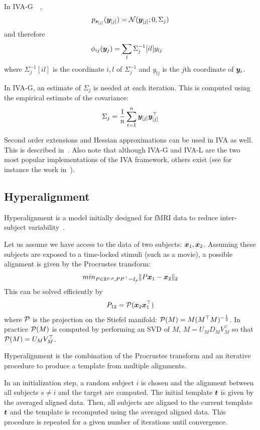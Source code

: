 In IVA-G~\cite{anderson2011joint}~\cite{via2011maximum},
\begin{align}
  p_{\boldsymbol{s}_{[j]}}(\boldsymbol{y}_{[j]}) = \mathcal{N}( \boldsymbol{y}_{[j]}; 0, \Sigma_j)
\end{align}
and therefore
\begin{align}
  \phi_{ij}(\boldsymbol{y}_j) &= \sum_l \Sigma_j^{-1}[il] y_{lj}
\end{align}
where  $\Sigma_j^{-1}[il]$ is the coordinate $i, l$ of $\Sigma_j^{-1}$ and
$y_{lj}$ is the $j$th coordinate of $\boldsymbol{y}_i$.

In IVA-G, an estimate of $\Sigma_j$ is needed at each iteration. This is
computed using the empirical estimate of the covariance:
\begin{align}
\Sigma_j = \frac1{n} \sum_{t=1}^n \boldsymbol{y}_{[j]} \boldsymbol{y}_{[j]}^{\top}
\end{align}

Second order extensions and Hessian approximations can be used in IVA as well.
This is described in~\cite{anderson2011joint}. Also note that although IVA-G and
IVA-L are the two most popular implementations of the IVA framework, others exist
(see for instance the work in~\cite{anderson2013independent}).

\subsection{Hyperalignment}
Hyperalignment is a model initially designed for fMRI data to reduce
inter-subject variability~\cite{haxby2011common}.

Let us assume we have access to the data of two subjects: $\boldsymbol{x}_1, \boldsymbol{x}_2$.
Assuming these subjects are exposed to a time-locked stimuli (such as a movie), a possible alignment is given by the Procrustes transform:
\begin{align}
min_{P \in \mathbb{R}^{p, p}, PP^{\top} = I_p} \|P \boldsymbol{x}_1 - \boldsymbol{x}_2 \|_2
\end{align}
This can be solved efficiently by
\begin{align}
  P_{12} = \mathcal{P}(\boldsymbol{x}_2 \boldsymbol{x}_1^{\top})
\end{align}
where $\mathcal{P}$ is the projection on the Stiefel manifold: $\mathcal{P}(M) = M
(M^{\top}M)^{-\frac12}$. In practice $\mathcal{P}(M)$ is computed by performing an SVD
of $M$, $M = U_M D_M V_M^{\top} $ so that $\mathcal{P}(M) = U_M V_M^{\top}$.

Hyperalignment is the combination of the Procrustes transform and an iterative
procedure to produce a template from multiple alignments.

In an initialization step, a random subject $i$ is chosen and the alignment
between all subjects $s \neq i$ and the target are computed. The initial
template $\boldsymbol{t}$ is given by the averaged aligned data. Then, all subjects are
aligned to the current template $\boldsymbol{t}$ and the template is recomputed using the
averaged aligned data. This procedure is repeated for a given number of
iterations until convergence.

